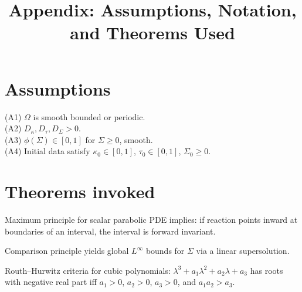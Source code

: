 \documentclass[11pt]{article}
\title{Appendix: Assumptions, Notation, and Theorems Used}
\date{}
\begin{document}
\maketitle

\section{Assumptions}
(A1) $\Omega$ is smooth bounded or periodic.\\
(A2) $D_\kappa,D_\tau,D_\Sigma>0$.\\
(A3) $\phi(\Sigma)\in[0,1]$ for $\Sigma\ge 0$, smooth.\\
(A4) Initial data satisfy $\kappa_0\in[0,1]$, $\tau_0\in[0,1]$, $\Sigma_0\ge 0$.

\section{Theorems invoked}
Maximum principle for scalar parabolic PDE implies:
if reaction points inward at boundaries of an interval, the interval is forward invariant.

Comparison principle yields global $L^\infty$ bounds for $\Sigma$ via a linear supersolution.

Routh--Hurwitz criteria for cubic polynomials:
$\lambda^3+a_1\lambda^2+a_2\lambda+a_3$ has roots with negative real part iff
$a_1>0$, $a_2>0$, $a_3>0$, and $a_1a_2>a_3$.
\end{document}
